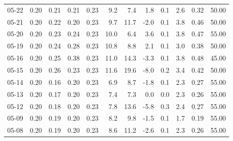 \begin{threeparttable}
{\begin{tabular}{lrrrrrrrrrrr}
  05-22 &          0.20 &          0.21 &          0.21 &        0.23 &                 9.2 &                 7.4 &        1.8 &                 0.1 &              2.6 &            0.32 &                  50.00 \\
  05-21 &          0.20 &          0.22 &          0.20 &        0.23 &                 9.7 &                11.7 &       -2.0 &                 0.1 &              3.8 &            0.46 &                  50.00 \\
  05-20 &          0.20 &          0.23 &          0.24 &        0.23 &                10.0 &                 6.4 &        3.6 &                 0.1 &              3.8 &            0.47 &                  55.00 \\
  05-19 &          0.20 &          0.24 &          0.28 &        0.23 &                10.8 &                 8.8 &        2.1 &                 0.1 &              3.0 &            0.38 &                  50.00 \\
  05-16 &          0.20 &          0.25 &          0.38 &        0.23 &                11.0 &                14.3 &       -3.3 &                 0.1 &              3.8 &            0.48 &                  45.00 \\
  05-15 &          0.20 &          0.26 &          0.23 &        0.23 &                11.6 &                19.6 &       -8.0 &                 0.2 &              3.4 &            0.42 &                  50.00 \\
  05-14 &          0.20 &          0.16 &          0.20 &        0.23 &                 6.9 &                 8.7 &       -1.8 &                 0.1 &              2.3 &            0.27 &                  55.00 \\
  05-13 &          0.20 &          0.17 &          0.20 &        0.23 &                 7.4 &                 7.3 &        0.0 &                 0.0 &              2.3 &            0.26 &                  55.00 \\
  05-12 &          0.20 &          0.18 &          0.20 &        0.23 &                 7.8 &                13.6 &       -5.8 &                 0.3 &              2.4 &            0.27 &                  55.00 \\
  05-09 &          0.20 &          0.19 &          0.20 &        0.23 &                 8.2 &                 9.8 &       -1.5 &                 0.1 &              1.7 &            0.19 &                  55.00 \\
  05-08 &          0.20 &          0.19 &          0.20 &        0.23 &                 8.6 &                11.2 &       -2.6 &                 0.1 &              2.3 &            0.26 &                  55.00 \\

\end{tabular}}
\end{threeparttable}
